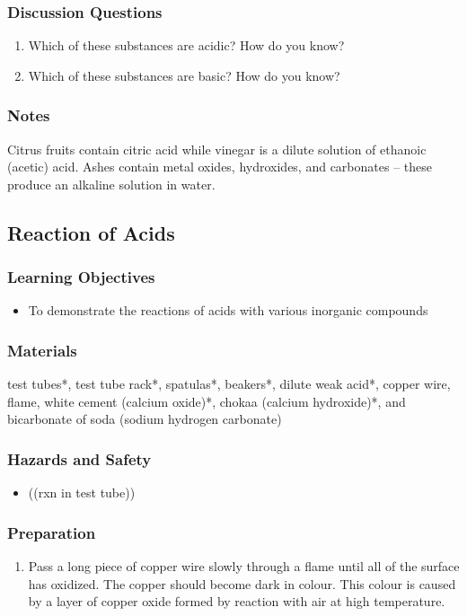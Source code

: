 \subsubsection*{Discussion Questions}
\begin{enumerate}
\item{Which of these substances are acidic? How do you know?}
\item{Which of these substances are basic? How do you know?}
\end{enumerate}

\subsubsection*{Notes}
Citrus fruits contain citric acid while vinegar is a dilute solution of ethanoic (acetic) acid. Ashes contain metal oxides, hydroxides, and carbonates -- these produce an alkaline solution in water.

\subsection{Reaction of Acids}

\subsubsection*{Learning Objectives}
\begin{itemize}
\item{To demonstrate the reactions of acids with various inorganic compounds}
\end{itemize}

\subsubsection*{Materials}
test tubes*, test tube rack*, spatulas*, beakers*, dilute weak acid*, copper wire, flame, white cement (calcium oxide)*, chokaa (calcium hydroxide)*, and bicarbonate of soda (sodium hydrogen carbonate)

\subsubsection*{Hazards and Safety}
\begin{itemize}
\item{((rxn in test tube))}
\end{itemize}

\subsubsection*{Preparation}
\begin{enumerate}
\item{Pass a long piece of copper wire slowly through a flame until all of the surface has oxidized. The copper should become dark in colour. This colour is caused by a layer of copper oxide formed by reaction with air at high temperature.}
\end{enumerate}

